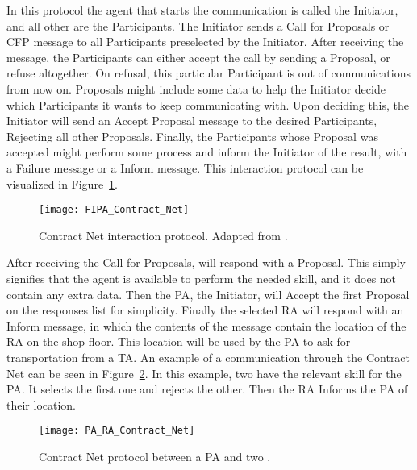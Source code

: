 In this protocol the agent that starts the communication is called the Initiator, and all other are the Participants. The Initiator sends a Call for Proposals or CFP message to all Participants preselected by the Initiator. After receiving the message, the Participants can either accept the call by sending a Proposal, or refuse altogether. On refusal, this particular Participant is out of communications from now on. Proposals might include some data to help the Initiator decide which Participants it wants to keep communicating with. Upon deciding this, the Initiator will send an Accept Proposal message to the desired Participants, Rejecting all other Proposals. Finally, the Participants whose Proposal was accepted might perform some process and inform the Initiator of the result, with a Failure message or a Inform message. This interaction protocol can be visualized in Figure~\ref{fig:contract_net_protocol}.\\

\begin{figure}[h!]
	\centering
	\texttt{[image: FIPA\_Contract\_Net]}
	\caption{Contract Net interaction protocol. Adapted from \cite{FIPA_Contract_Net}.}
	\label{fig:contract_net_protocol}
\end{figure}

After receiving the Call for Proposals,  will respond with a Proposal. This simply signifies that the agent is available to perform the needed skill, and it does not contain any extra data. Then the \acrshort{PA}, the Initiator, will Accept the first Proposal on the responses list for simplicity. Finally the selected \acrshort{RA} will respond with an Inform message, in which the contents of the message contain the location of the \acrshort{RA} on the shop floor. This location will be used by the \acrshort{PA} to ask for transportation from a \acrshort{TA}. An example of a communication through the Contract Net can be seen in Figure~\ref{fig:pa_ra_contract_net}. In this example, two  have the relevant skill for the \acrshort{PA}. It selects the first one and rejects the other. Then the \acrshort{RA} Informs the \acrshort{PA} of their location.\\

\begin{figure}[h!]
	\centering
	\texttt{[image: PA\_RA\_Contract\_Net]}
	\caption{Contract Net protocol between a \acrlong{PA} and two .}
	\label{fig:pa_ra_contract_net}
\end{figure}

